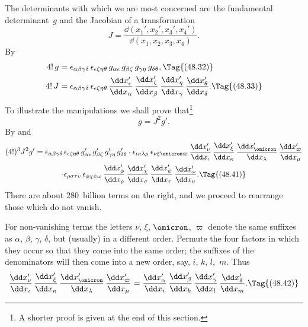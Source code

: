 \documentclass[12pt]{book}
\begin{document}
The determinants with which we are most concerned are the fundamental
determinant~$g$ and the Jacobian of a transformation
%
\[
J = \frac{\dd(x_{1}', x_{2}', x_{3}', x_{4}')}{\dd(x_{1}, x_{2}, x_{3}, x_{4})}.
\]
By~
\begin{align*}
  4!\, g &= \epsilon_{\alpha\beta\gamma\delta}\, \epsilon_{\epsilon\zeta\eta\theta}\,
  g_{\alpha\epsilon}\, g_{\beta\zeta}\, g_{\gamma\eta}\, g_{\delta\theta},
\Tag{(48.32)} \\
  4!\, J &= \epsilon_{\alpha\beta\gamma\delta}\, \epsilon_{\epsilon\zeta\eta\theta}\,
  \frac{\dd x_{\epsilon}'}{\dd x_{\alpha}}\,
  \frac{\dd x_{\zeta}'}{\dd x_{\beta}}\,
  \frac{\dd x_{\eta}'}{\dd x_{\gamma}}\,
  \frac{\dd x_{\theta}'}{\dd x_{\delta}}.
\Tag{(48.33)}
\end{align*}
To illustrate the manipulations we shall prove that\footnote
  {A shorter proof is given at the end of this section.}
\[
g = J^{2} g'.
\]
By  and~
\begin{multline*}
  (4!)^{3} J^{2} g'
  = \epsilon_{\alpha\beta\gamma\delta}\, \epsilon_{\epsilon\zeta\eta\theta}\,
  g_{\alpha\epsilon}'\, g_{\beta\zeta}'\, g_{\gamma\eta}'\, g_{\delta\theta}'
  \cdot \epsilon_{\iota\kappa\lambda\mu}\, \epsilon_{\nu\xi\omicron\varpi}\,
  \frac{\dd x_{\nu}'}{\dd x_{\iota}}\,
  \frac{\dd x_{\xi}'}{\dd x_{\kappa}}\,
  \frac{\dd x_{\omicron}'}{\dd x_{\lambda}}\,
  \frac{\dd x_{\varpi}'}{\dd x_{\mu}} \\
  \cdot \epsilon_{\rho\sigma\tau\upsilon}\, \epsilon_{\phi\chi\psi\omega}\,
  \frac{\dd x_{\phi}'}{\dd x_{\rho}}\,
  \frac{\dd x_{\chi}'}{\dd x_{\sigma}}\,
  \frac{\dd x_{\psi}'}{\dd x_{\tau}}\,
  \frac{\dd x_{\omega}'}{\dd x_{\upsilon}}.
  \Tag{(48.41)}
\end{multline*}
There are about $280$~billion terms on the right, and we proceed to rearrange
those which do not vanish.

For non-vanishing terms the letters $\nu$, $\xi$, $\omicron$, $\varpi$ denote the same suffixes as
$\alpha$, $\beta$, $\gamma$, $\delta$, but (usually) in a different order. Permute the four factors in which
they occur so that they come into the same order; the suffixes of the denominators
will then come into a new order, say, $i$, $k$, $l$,~$m$. Thus
\[
  \frac{\dd x_{\nu}'}{\dd x_{\iota}}\,
  \frac{\dd x_{\xi}'}{\dd x_{\kappa}}\,
  \frac{\dd x_{\omicron}'}{\dd x_{\lambda}}\,
  \frac{\dd x_{\varpi}'}{\dd x_{\mu}}
  = \frac{\dd x_{\alpha}'}{\dd x_{i}}\,
  \frac{\dd x_{\beta}'}{\dd x_{k}}\,
  \frac{\dd x_{\gamma}'}{\dd x_{l}}\,
  \frac{\dd x_{\delta}'}{\dd x_{m}}.
\Tag{(48.42)}
\]
\end{document}
